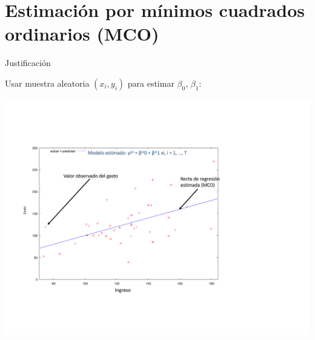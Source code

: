 \documentclass[11pt,handout]{beamer}
\begin{document}
\section{Estimación por mínimos cuadrados ordinarios (MCO)}

\begin{frame}
{Justificación}

\pause 

Usar muestra aleatoria $(x_i, y_i)$ para estimar $\beta_0$, $\beta_1$:

\pause 
\vspace{-2cm}
\begin{center}
	\includegraphics[scale=.45]{fig2-1.pdf} 
\end{center}

\end{frame}
\end{document}
